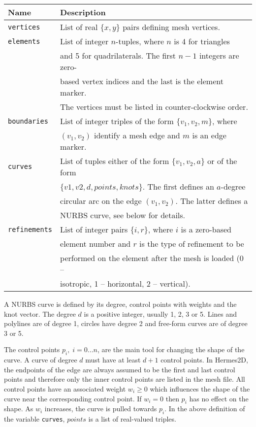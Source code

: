 \begin{center}
\begin{tabular}{|l|l|}
\hline
Name & Description \\
\hline \hline
{\tt vertices} & List of real $\{x, y\}$ pairs defining mesh vertices. \\
\hline
{\tt elements} & List of integer $n$-tuples, where $n$ is 4 for triangles\\
               & and 5 for quadrilaterals. The first $n-1$ integers are zero-\\
               & based vertex indices and the last is the element marker.\\
               & The vertices must be listed in counter-clockwise order.\\
\hline
{\tt boundaries} & List of integer triples of the form $\{ v_1, v_2, m \}$, where \\
                 & $(v_1, v_2)$ identify a mesh edge and $m$ is an edge marker. \\
\hline
{\tt curves} & List of tuples either of the form $\{ v_1, v_2, a \}$ or of the form \\
             & $\{ v1, v2, d, points, knots \}$. The first defines an $a$-degree \\
             & circular arc on the edge $(v_1, v_2)$. The latter defines a\\
             & NURBS curve, see below for details. \\
\hline
{\tt refinements} & List of integer pairs $\{ i, r \}$, where $i$ is a zero-based \\
                  & element number and $r$ is the type of refinement to be \\
                  & performed on the element after the mesh is loaded (0 --\\
                  &  isotropic, 1 -- horizontal, 2 -- vertical). \\
\hline
\end{tabular}
\end{center}

A NURBS curve is defined by its degree, control points with weights and the knot
vector. The degree $d$ is a positive integer, usually 1, 2, 3 or 5. Lines and polylines
are of degree 1, circles have degree 2 and free-form curves are of degree 3 or 5.

The control points $p_i,\; i = 0 \dots n$, are the main tool for changing the shape of
the curve. A curve of degree $d$ must have at least $d+1$ control points. In Hermes2D,
the endpoints of the edge are always assumed to be the first and last control points
and therefore only the inner control points are listed in the mesh file.
All control points have an associated weight $w_i \geq 0$ which influences
the shape of the curve near the corresponding control point.
If $w_i = 0$ then $p_i$ has no effect on the shape.
As $w_i$ increases, the curve is pulled towards $p_i$. In the above definition of
the variable {\tt curves}, $points$ is a list of real-valued triples.

